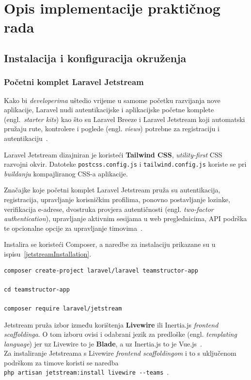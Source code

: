 \section{Opis implementacije praktičnog rada}

\subsection{Instalacija i konfiguracija okruženja}

\subsubsection{Početni komplet Laravel Jetstream}
Kako bi \textit{developerima} uštedio vrijeme u samome početku razvijanja nove aplikacije, Laravel nudi autentikacijske i aplikacijske početne komplete (engl.~\textit{starter kits}) kao što su Laravel Breeze i Laravel Jetstream koji automatski pružaju rute, kontrolere i poglede (engl. \textit{views}) potrebne za registraciju i autentikaciju~\cite{starterKits}.

Laravel Jetstream dizajniran je koristeći \textbf{Tailwind CSS}, \textit{utility-first} CSS razvojni okvir. Datoteke \texttt{postcss.config.js} i \texttt{tailwind.config.js} koriste se pri \textit{buildanju} kompajliranog CSS-a aplikacije.

Značajke koje početni komplet Laravel Jetstream pruža su autentikacija, registracija, upravljanje korisničkim profilima, ponovno postavljanje lozinke, verifikacija e-adrese, dvostruka provjera autentičnosti (engl. \textit{two-factor authentication}), upravljanje aktivnim sesijama u web preglednicima, API podrška te opcionalne opcije za upravljanje timovima~\cite{jetstreamIntro}.

Instalira se koristeći Composer, a naredbe za instalaciju prikazane su u ispisu~\ref{jetstreamInstallation}.

\begin{lstlisting}[caption={Naredbe za instalaciju Jetstream paketa u novi Laravel projekt}, label=jetstreamInstallation]
composer create-project laravel/laravel teamstructor-app

cd teamstructor-app

composer require laravel/jetstream
\end{lstlisting}

Jetstream pruža izbor između korištenja \textbf{Livewire} ili Inertia.js \textit{frontend scaffoldinga}. O tom izboru ovisi i odabrani jezik za predloške (engl. \textit{templating language}) jer uz Livewire to je \textbf{Blade}, a uz Inertia.js to je Vue.js~\cite{jetstreamIntro}. \\ Za instaliranje Jetstreama s Livewire \textit{frontend scaffoldingom} i to s uključenom podrškom za timove koristi se naredba \\ \texttt{php artisan jetstream:install livewire -{}-teams}~\cite{jetstreamInstallation}.

